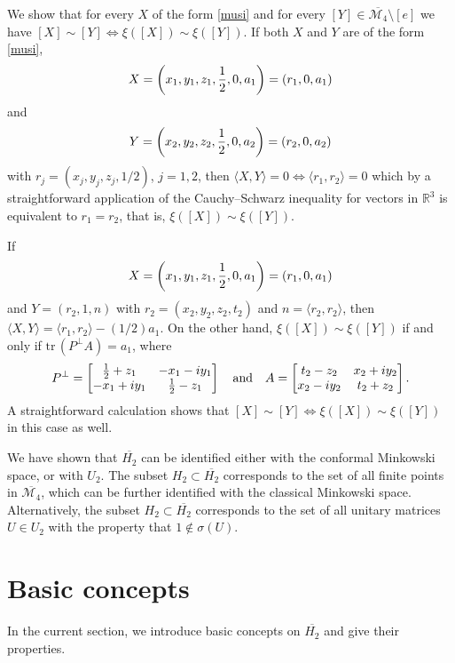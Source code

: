 \documentclass[10pt,a4paper]{amsart}
\newcommand\oH{{\overline{H_2}}}
\theoremstyle{definition}
\theoremstyle{remark}
\numberwithin{subsection}{section}
\numberwithin{equation}{section}
\begin{document}
We show that for every $X$ of the form \eqref{musi} and for every $[Y] \in \overline{ \mathcal{M}_4 }\setminus [e]$ we have $[X] \sim [Y] \iff \xi ([X]) \sim \xi ([Y])$.
If both $X$ and $Y$ are of the form \eqref{musi},
\[
X =\left(x_1,y_1,z_1, {1 \over 2}, 0 , a_1 \right) = (r_1, 0, a_1) 
\]
and 
\[
Y =\left(x_2,y_2,z_2, {1 \over 2}, 0 , a_2 \right) = (r_2, 0, a_2)
\]
with $r_j = \left( x_j, y_j , z_j , 1/2 \right)$, $j=1,2$,
then $\langle X , Y \rangle = 0 \iff \langle r_1 , r_2 \rangle =0$ which by a straightforward application of the Cauchy--Schwarz inequality for vectors in $\mathbb{R}^3$ is equivalent to $r_1 = r_2$, that is, $\xi ([X]) \sim \xi ([Y])$.

If
\[
X =\left(x_1,y_1,z_1, {1 \over 2}, 0 , a_1 \right) = (r_1, 0, a_1)
\]
and $Y= (r_2, 1, n)$ with $r_2 = (x_2 , y_2, z_2 , t_2)$ and $n= \langle r_2 , r_2 \rangle$, then
$\langle X, Y \rangle = \langle r_1 , r_2 \rangle - (1/2)a_1$.
On the other hand, $\xi ([X]) \sim \xi ([Y])$ if and only if $\mathrm{tr}\, (P^\perp A) = a_1$, where
\[
P^\perp = \left[ \begin{matrix}  {1 \over 2}  + z_1 & -x_1 -iy_1 \cr -x_1+ iy_1 & {1 \over 2} - z_1 \cr\end{matrix} \right] \ \ \ \text{and} \ \ \ 
A=  \left[ \begin{matrix}  t_2 -z_2 & x_2 +iy_2 \cr x_2 -iy_2  & t_2 +z_2 \cr\end{matrix} \right].
\]
A straightforward calculation shows that $[X] \sim [Y] \iff \xi ([X]) \sim \xi ([Y])$ in  this case as well.

We have shown that $\oH$ can be identified either with the conformal Minkowski space, or with $U_2$. 
The subset $H_2 \subset \oH$ corresponds to the set of all finite points in $\overline{ \mathcal{M}_4 }$, which can be further identified with the classical Minkowski space. Alternatively, the
 subset $H_2 \subset \oH$ corresponds to the set of all unitary matrices $U \in U_2$ with the property that $1 \not\in \sigma (U)$.









\section{Basic concepts}\label{prelim}
In the current section, we introduce basic concepts on $\oH$ and give their properties. 
\end{document}

